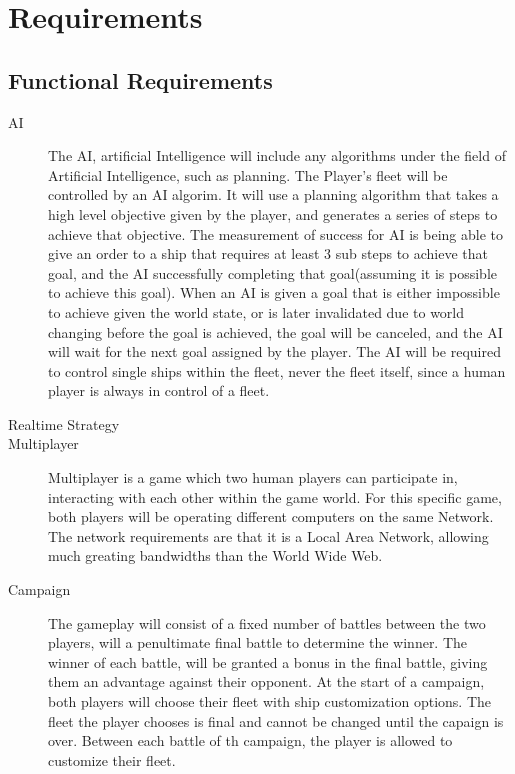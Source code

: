 \section[Requirements]{Requirements}
\label{section:requirements}



\subsection{Functional Requirements}


\begin{description}

\item[AI] 
The AI, artificial Intelligence will include any algorithms under the field of Artificial Intelligence, such as planning.
The Player's fleet will be controlled by an AI algorim. It will use a planning algorithm that takes a high level objective given by the player, and generates a series of steps to achieve that objective.
The measurement of success for AI is being able to give an order to a ship that requires at least 3 sub steps to achieve that goal, and the AI successfully completing that goal(assuming it is possible to achieve this goal).
When an AI is given a goal that is either impossible to achieve given the world state, or is later invalidated due to world changing before the goal is achieved, the goal will be canceled, and the AI will wait for the next goal assigned by the player.
The AI will be required to control single ships within the fleet, never the fleet itself, since a human player is always in control of a fleet.

\item[Realtime Strategy]


\item[Multiplayer]
Multiplayer is a game which two human players can participate in, interacting with each other within the game world.
For this specific game, both players will be operating different computers on the same Network.
The network requirements are that it is a Local Area Network, allowing much greating bandwidths than the World Wide Web.

\item[Campaign]
The gameplay will consist of a fixed number of battles between the two players, will a penultimate final battle to determine the winner.
The winner of each battle, will be granted a bonus in the final battle, giving them an advantage against their opponent.
At the start of a campaign, both players will choose their fleet with ship customization options.
The fleet the player chooses is final and cannot be changed until the capaign is over.
Between each battle of th campaign, the player is allowed to customize their fleet.



\end{description}
